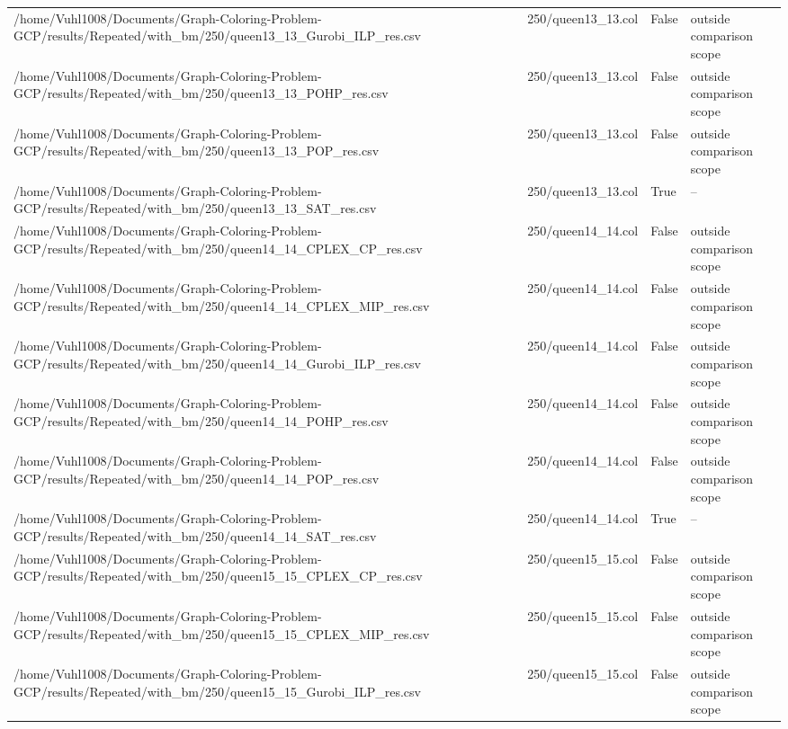 \begin{table}[htbp]
\begin{tabular}{llll}
/home/Vuhl1008/Documents/Graph-Coloring-Problem-GCP/results/Repeated/with\_bm/250/queen13\_13\_Gurobi\_ILP\_res.csv & 250/queen13\_13.col & False & outside comparison scope \\
/home/Vuhl1008/Documents/Graph-Coloring-Problem-GCP/results/Repeated/with\_bm/250/queen13\_13\_POHP\_res.csv & 250/queen13\_13.col & False & outside comparison scope \\
/home/Vuhl1008/Documents/Graph-Coloring-Problem-GCP/results/Repeated/with\_bm/250/queen13\_13\_POP\_res.csv & 250/queen13\_13.col & False & outside comparison scope \\
/home/Vuhl1008/Documents/Graph-Coloring-Problem-GCP/results/Repeated/with\_bm/250/queen13\_13\_SAT\_res.csv & 250/queen13\_13.col & True & -- \\
/home/Vuhl1008/Documents/Graph-Coloring-Problem-GCP/results/Repeated/with\_bm/250/queen14\_14\_CPLEX\_CP\_res.csv & 250/queen14\_14.col & False & outside comparison scope \\
/home/Vuhl1008/Documents/Graph-Coloring-Problem-GCP/results/Repeated/with\_bm/250/queen14\_14\_CPLEX\_MIP\_res.csv & 250/queen14\_14.col & False & outside comparison scope \\
/home/Vuhl1008/Documents/Graph-Coloring-Problem-GCP/results/Repeated/with\_bm/250/queen14\_14\_Gurobi\_ILP\_res.csv & 250/queen14\_14.col & False & outside comparison scope \\
/home/Vuhl1008/Documents/Graph-Coloring-Problem-GCP/results/Repeated/with\_bm/250/queen14\_14\_POHP\_res.csv & 250/queen14\_14.col & False & outside comparison scope \\
/home/Vuhl1008/Documents/Graph-Coloring-Problem-GCP/results/Repeated/with\_bm/250/queen14\_14\_POP\_res.csv & 250/queen14\_14.col & False & outside comparison scope \\
/home/Vuhl1008/Documents/Graph-Coloring-Problem-GCP/results/Repeated/with\_bm/250/queen14\_14\_SAT\_res.csv & 250/queen14\_14.col & True & -- \\
/home/Vuhl1008/Documents/Graph-Coloring-Problem-GCP/results/Repeated/with\_bm/250/queen15\_15\_CPLEX\_CP\_res.csv & 250/queen15\_15.col & False & outside comparison scope \\
/home/Vuhl1008/Documents/Graph-Coloring-Problem-GCP/results/Repeated/with\_bm/250/queen15\_15\_CPLEX\_MIP\_res.csv & 250/queen15\_15.col & False & outside comparison scope \\
/home/Vuhl1008/Documents/Graph-Coloring-Problem-GCP/results/Repeated/with\_bm/250/queen15\_15\_Gurobi\_ILP\_res.csv & 250/queen15\_15.col & False & outside comparison scope \\

\end{tabular}
\end{table}
